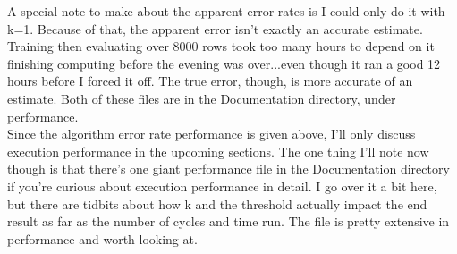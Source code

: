 \documentclass{article}
\begin{document}
A special note to make about the apparent error rates is I could only do it with k=1.  Because of that, the apparent error isn't exactly an accurate estimate.  Training then evaluating over 8000 rows took too many hours to depend on it finishing computing before the evening was over...even though it ran a good 12 hours before I forced it off.  The true error, though, is more accurate of an estimate.  Both of these files are in the Documentation directory, under performance.\\

Since the algorithm error rate performance is given above, I'll only discuss execution performance in the upcoming sections.  The one thing I'll note now though is that there's one giant performance file in the Documentation directory  if you're curious about execution performance in detail.  I go over it a bit here, but there are tidbits about how k and the threshold actually impact the end result as far as the number of cycles and time run. The file is pretty extensive in performance and worth looking at.
\end{document}

